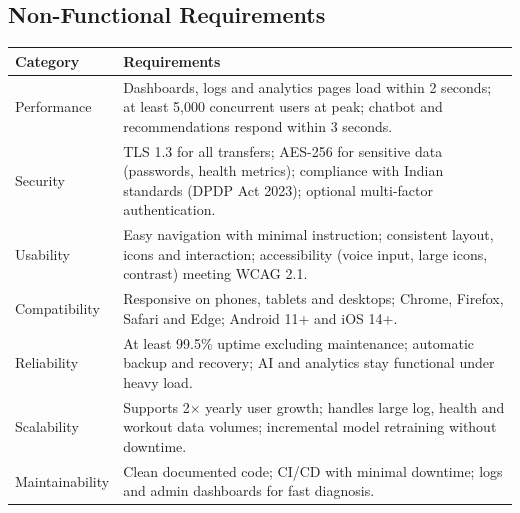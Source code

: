 \documentclass[11pt,a4paper]{report}
\begin{document}
\subsection{Non-Functional Requirements}
\small
\begin{longtable}{|p{2.5cm}|p{11.9cm}|}\hline
\textbf{Category} & \textbf{Requirements}\\\hline\endhead
Performance & Dashboards, logs and analytics pages load within 2 seconds; at least 5,000 concurrent users at peak; chatbot and recommendations respond within 3 seconds.\\\hline
Security & TLS 1.3 for all transfers; AES-256 for sensitive data (passwords, health metrics); compliance with Indian standards (DPDP Act 2023); optional multi-factor authentication.\\\hline
Usability & Easy navigation with minimal instruction; consistent layout, icons and interaction; accessibility (voice input, large icons, contrast) meeting WCAG 2.1.\\\hline
Compatibility & Responsive on phones, tablets and desktops; Chrome, Firefox, Safari and Edge; Android 11+ and iOS 14+.\\\hline
Reliability & At least 99.5\% uptime excluding maintenance; automatic backup and recovery; AI and analytics stay functional under heavy load.\\\hline
Scalability & Supports 2$\times$ yearly user growth; handles large log, health and workout data volumes; incremental model retraining without downtime.\\\hline
Maintainability & Clean documented code; CI/CD with minimal downtime; logs and admin dashboards for fast diagnosis.\\\hline
\end{longtable}
\normalsize
\end{document}
